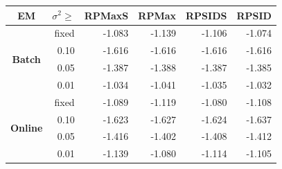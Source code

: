 \documentclass[14pt]{ffslides}
\begin{document}
\blankpage

\begin{minipage}{0.495\textwidth}

\begin{center}
\end{center}
\vskip 1.5cm
\begin{center}
\begin{tabular}{c|r|rrrr}
  \hline %
  \textbf{EM} &\textbf{$\sigma^2 \geq$} & \textbf{RPMaxS} & \textbf{RPMax} & \textbf{RPSIDS} & \textbf{RPSID} \\
  \hline
  \multirow{4}{*}{\textbf{Batch}} & fixed & -1.083 & -1.139 & -1.106 & -1.074 \\
  & 0.10 & -1.616 & -1.616 & -1.616 & -1.616 \\
  & 0.05 & -1.387 & -1.388 & -1.387 & -1.385 \\
  & 0.01 & -1.034 & -1.041 & -1.035 & -1.032 \\
  \hline
  \multirow{4}{*}{\textbf{Online}} & fixed & -1.089 & -1.119 & -1.080 & -1.108 \\
  & 0.10 & -1.623 & -1.627 & -1.624 & -1.637 \\
  & 0.05 & -1.416 & -1.402 & -1.408 & -1.412 \\
  & 0.01 & -1.139 & -1.080 & -1.114 & -1.105 \\ 
  \hline
\end{tabular}
\end{center}
\end{minipage}
\end{document}
